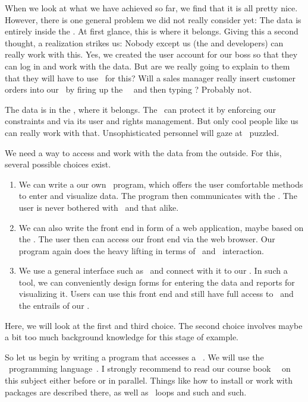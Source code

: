 %
%
\label{sec:factoryFromPython}%
%
When we look at what we have achieved so far, we find that it is all pretty nice.
However, there is one general problem we did not really consider yet:
The data is entirely inside the \db.
At first glance, this is where it belongs.
Giving this a second thought, a realization strikes us:
Nobody except us (the  and developers) can really work with this.
Yes, we created the user account  for our boss so that they can log in and work with the data.
But are we really going to explain to them that they will have to use \sql\ for this?
Will a sales manager really insert customer orders into our \db\ by firing up the \sql\ \client\ and then typing ?
Probably not.

The data is in the \db, where it belongs.
The \dbms\ can protect it by enforcing our constraints and via its user and rights management.
But only cool people like us can really work with that.
Unsophisticated personnel will gaze at \psql\ puzzled.

We need a way to access and work with the data from the outside.
For this, several possible choices exist.%
%
\begin{enumerate}%
%
\item We can write a our own \client\ program, which offers the user comfortable methods to enter and visualize data.
The program then communicates with the \db.
The user is never bothered with \sql\ and that alike.%
%
\item We can also write the front end in form of a web application, maybe based on the  \server.
The user then can access our front end via the web browser.
Our program again does the heavy lifting in terms of \sql\ and \db\ interaction.%
%
\item We use a general interface such as \libreofficeBase\ and connect with it to our \db.
In such a tool, we can conveniently design forms for entering the data and reports for visualizing it.
Users can use this front end and still have full access to \sql\ and the entrails of our \db.%
%
\end{enumerate}%
%
Here, we will look at the first and third choice.
The second choice involves maybe a bit too much background knowledge for this stage of  example.

So let us begin by writing a program that accesses a \postgresql\ \db.
We will use the \python\ programming language~\cite{programmingWithPython}.
I strongly recommend to read our course book~~\cite{programmingWithPython} on this subject either before or in parallel.
Things like how to install or work with packages are described there, as well as ~loops and such and such.

